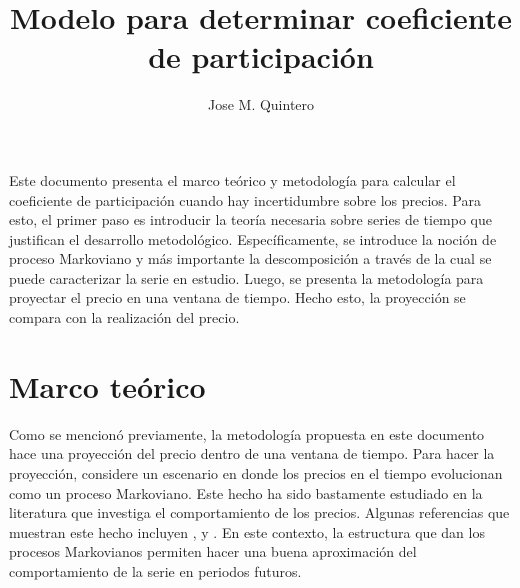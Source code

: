 \documentclass{article}
\title{\vspace{-1cm} Modelo para determinar coeficiente de participación}
\author{Jose M. Quintero}
\date{ }
\begin{document}
\maketitle
Este documento presenta el marco teórico y metodología para calcular el coeficiente de participación cuando hay incertidumbre sobre los precios. Para esto, el primer paso es introducir la teoría necesaria sobre series de tiempo que justifican el desarrollo metodológico. Específicamente, se introduce la noción de proceso Markoviano y más importante la descomposición a través de la cual se puede caracterizar la serie en estudio.  Luego, se presenta la metodología para proyectar el precio en una ventana de tiempo. Hecho esto, la proyección se compara con la realización del precio. 
\section{Marco teórico}

Como se mencionó previamente, la metodología propuesta en este documento hace una proyección del precio dentro de una ventana de tiempo. Para hacer la proyección, considere un escenario en donde los precios en el tiempo evolucionan como un proceso Markoviano. Este hecho ha sido bastamente estudiado en la literatura que investiga el comportamiento de los precios. Algunas referencias que muestran este hecho incluyen \citet{Nag20}, \citet{Wets15} y \citet{Ryan73}. En este contexto, la estructura que dan los procesos Markovianos permiten hacer una buena aproximación del comportamiento de la serie en periodos futuros. 
\end{document}
